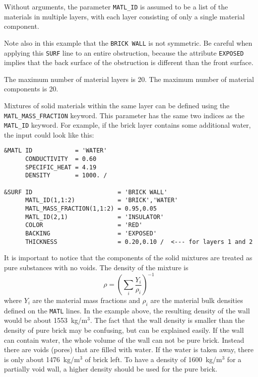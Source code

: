 \documentclass[11pt]{book}
\newcommand{\ct}{\tt\small}
\newcommand{\be}{\begin{equation}}
\newcommand{\ee}{\end{equation}}
\begin{document}
\noindent
Without arguments, the parameter {\ct MATL\_ID} is assumed to be a list of the materials in multiple layers, with each layer consisting of only a single
material component.

Note also in this example that the {\ct BRICK WALL} is not symmetric. Be careful when applying this {\ct SURF} line to an entire obstruction, because the
attribute {\ct EXPOSED} implies that the back surface of the obstruction is different than the front surface.

\begin{warning}
\noindent
The maximum number of material layers is 20. The maximum number of material components is 20.
\end{warning}

Mixtures of solid materials within the same layer can be defined using
the {\ct MATL\_MASS\_FRACTION} keyword. This parameter has the same two indices as the {\ct MATL\_ID} keyword. For example, if the
brick layer contains some additional water, the input could look like this:

\footnotesize
\begin{verbatim}
&MATL ID            = 'WATER'
      CONDUCTIVITY  = 0.60
      SPECIFIC_HEAT = 4.19
      DENSITY       = 1000. /

&SURF ID                        = 'BRICK WALL'
      MATL_ID(1,1:2)            = 'BRICK','WATER'
      MATL_MASS_FRACTION(1,1:2) = 0.95,0.05
      MATL_ID(2,1)              = 'INSULATOR'
      COLOR                     = 'RED'
      BACKING                   = 'EXPOSED'
      THICKNESS                 = 0.20,0.10 /  <--- for layers 1 and 2

\end{verbatim}
\normalsize
\noindent
It is important to notice that the components of the solid mixtures
are treated as pure substances with no voids. The density of the
mixture is
\be
\rho = \left(\sum_i\frac{Y_i}{\rho_i}\right)^{-1}
\ee
where $Y_i$ are the material mass fractions and $\rho_i$ are the
material bulk densities defined on the {\ct MATL} lines. In the
example above, the resulting density of the wall would be about
1553~kg/m$^3$. The fact that the wall density is smaller than the
density of pure brick may be confusing, but can be explained easily.
If the wall can contain water, the whole volume of the wall can not be
pure brick. Instead there are voids (pores) that are
filled with water. If the water is taken away, there is only about
1476~kg/m$^3$ of brick left. To have a density of 1600~kg/m$^3$ for a
partially void wall, a higher density should be used for the pure
brick.
\end{document}

